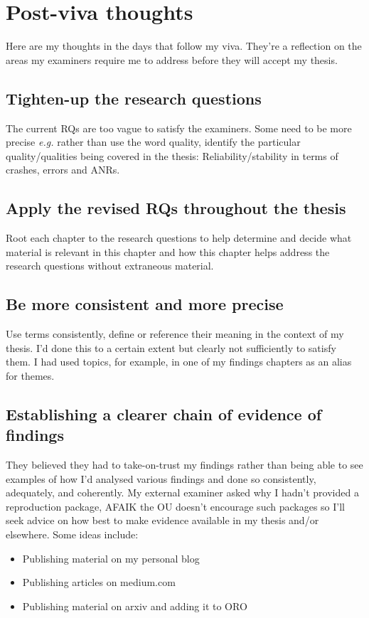 \chapter{Post-viva thoughts}
Here are my thoughts in the days that follow my viva. They're a reflection on the areas my examiners require me to address before they will accept my thesis.


\section{Tighten-up the research questions}
The current RQs are too vague to satisfy the examiners. Some need to be more precise \emph{e.g.} rather than use the word quality, identify the particular quality/qualities being covered in the thesis: Reliability/stability in terms of crashes, errors and ANRs.  

\section{Apply the revised RQs throughout the thesis}
Root each chapter to the research questions to help determine and decide what material is relevant in this chapter and how this chapter helps address the research questions without extraneous material.


\section{Be more consistent and more precise}
Use terms consistently, define or reference their meaning in the context of my thesis. I'd done this to a certain extent but clearly not sufficiently to satisfy them. I had used topics, for example, in one of my findings chapters as an alias for themes.

\section{Establishing a clearer chain of evidence of findings}
They believed they had to take-on-trust my findings rather than being able to see examples of how I'd analysed various findings and done so consistently, adequately, and coherently. My external examiner asked why I hadn't provided a reproduction package, AFAIK the OU doesn't encourage such packages so I'll seek advice on how best to make evidence available in my thesis and/or elsewhere. Some ideas include: 
\begin{itemize}
\item Publishing material on my personal blog
\item Publishing articles on medium.com
\item Publishing material on arxiv and adding it to ORO
\end{itemize}

